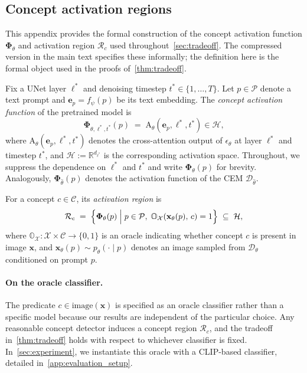 \subsection{Concept activation regions}
This appendix provides the formal construction of the concept activation function $\boldsymbol{\Phi}_\theta$ and activation region $\mathcal{R}_c$ used throughout~\cref{sec:tradeoff}. The compressed version in the main text specifies these informally; the definition here is the formal object used in the proofs of~\cref{thm:tradeoff}.

\begin{definition}
\label{def:activation}
Fix a UNet layer $\ell^*$ and denoising timestep $t^* \in \{1,\ldots,T\}$. Let $p \in \mathcal{P}$ denote a text prompt and $\mathbf{e}_p = f_\psi(p)$ be its text embedding. The \emph{concept activation function} of the pretrained model is
\begin{equation}
    \boldsymbol{\Phi}_{\theta, \ell^*,t^*}(p) \;=\; \mathrm{A}_{\theta}(\mathbf{e}_p,\ell^*,t^*) \in \mathcal{H},
\end{equation}
where $\mathrm{A}_{\theta}(\mathbf{e}_p, \ell^*, t^*)$ denotes the cross-attention output 
of $\epsilon_\theta$ at layer $\ell^*$ and timestep $t^*$, and $\mathcal{H} := \mathbb{R}^{d_{\ell^*}}$ is the corresponding activation space. 
Throughout, we suppress the dependence on $\ell^*$ 
and $t^*$ and write $\boldsymbol{\Phi}_\theta(p)$ for brevity.
Analogously, $\boldsymbol{\Phi}_{\hat{\theta}}(p)$ denotes the activation function of the CEM $\mathcal{D}_{\hat\theta}$.

For a concept $c \in \mathcal{C}$, its \emph{activation region} is
\begin{equation}
    \mathcal{R}_c
    \;=\;
    \Bigl\{
        \boldsymbol{\Phi}_{\theta}(p)
        \;\Big|\;
        p \in \mathcal{P},\;
        \mathbb{O}_{\mathcal{X}}\!\left(\mathbf{x}_{\theta}(p),\, c\right) = 1
    \Bigr\}
    \;\subseteq\; \mathcal{H},
\end{equation}
where $\mathbb{O}_{\mathcal{X}} : \mathcal{X} \times \mathcal{C} \to \{0,1\}$ is an oracle indicating whether concept $c$ is present in image $\mathbf{x}$, and $\mathbf{x}_{\theta}(p) \sim p_{\theta}(\cdot \mid p)$ denotes an image sampled from $\mathcal{D}_\theta$ conditioned on prompt $p$.
\end{definition}

\paragraph{On the oracle classifier.}
The predicate $c \in \text{image}(\mathbf{x})$ is specified as an oracle classifier rather than a specific model because our results are independent of the particular choice. Any reasonable concept detector induces a concept region $\mathcal{R}_c$, and the tradeoff in~\cref{thm:tradeoff} holds with respect to whichever classifier is fixed. In~\cref{sec:experiment}, we instantiate this oracle with a CLIP-based classifier, detailed in~\cref{app:evaluation_setup}. 